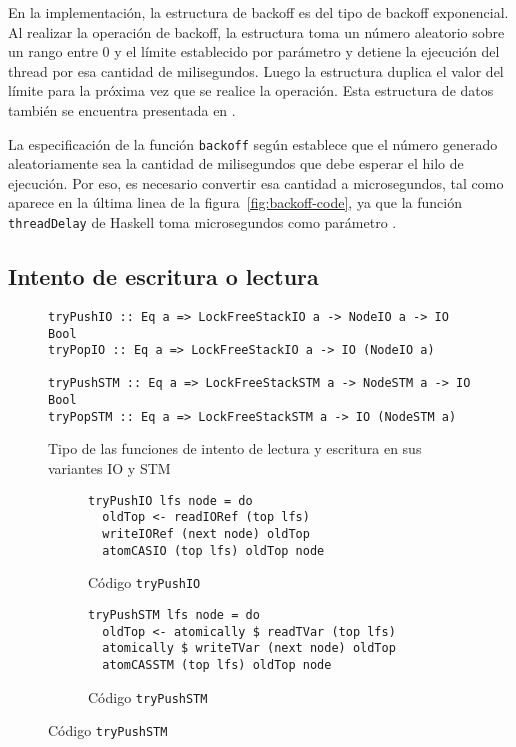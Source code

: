 En la implementación, la estructura de backoff es del tipo de backoff exponencial. Al realizar la operación de backoff, la estructura toma un número aleatorio sobre un rango entre 0 y el límite establecido por parámetro y detiene la ejecución del thread por esa cantidad de milisegundos. Luego la estructura duplica el valor del límite para la próxima vez que se realice la operación. Esta estructura de datos también se encuentra presentada en \cite{shavit}.

La especificación de la función \texttt{backoff} según \cite{shavit} establece que el número generado aleatoriamente sea la cantidad de milisegundos que debe esperar el hilo de ejecución. Por eso, es necesario convertir esa cantidad a microsegundos, tal como aparece en la última linea de la figura~\ref{fig:backoff-code}, ya que la función \texttt{threadDelay} de Haskell toma microsegundos como parámetro \cite{threadDelay}.

\subsection{Intento de escritura o lectura}\label{sub:lfs-intentos}

\begin{figure}[t]\label{intentos-types}
  \begin{verbatim}
tryPushIO :: Eq a => LockFreeStackIO a -> NodeIO a -> IO Bool
tryPopIO :: Eq a => LockFreeStackIO a -> IO (NodeIO a)

tryPushSTM :: Eq a => LockFreeStackSTM a -> NodeSTM a -> IO Bool
tryPopSTM :: Eq a => LockFreeStackSTM a -> IO (NodeSTM a)
  \end{verbatim}
  \caption{Tipo de las funciones de intento de lectura y escritura en sus variantes IO y STM}
\end{figure}

\begin{figure}[t]\label{intentos-code}
  \begin{subfigure}[b]{0.5\textwidth}
  \begin{verbatim}
tryPushIO lfs node = do
  oldTop <- readIORef (top lfs)
  writeIORef (next node) oldTop
  atomCASIO (top lfs) oldTop node
  \end{verbatim}
  \caption{Código \texttt{tryPushIO}}
  \end{subfigure}
  \begin{subfigure}[b]{0.5\textwidth}
    \begin{verbatim}
tryPushSTM lfs node = do
  oldTop <- atomically $ readTVar (top lfs)
  atomically $ writeTVar (next node) oldTop
  atomCASSTM (top lfs) oldTop node
    \end{verbatim}
    \caption{Código \texttt{tryPushSTM}}
\end{subfigure}
\end{figure}

